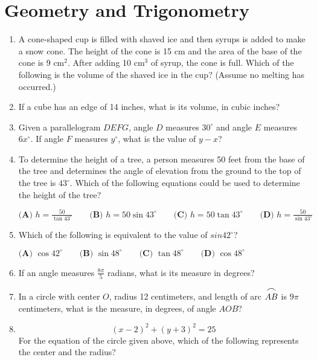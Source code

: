 \documentclass[../satmath.tex]{subfiles}
\begin{document}
\chapter{Geometry and Trigonometry}
\begin{enumerate}[label=\bfseries\arabic*.]

\item A cone-shaped cup is filled with shaved ice and then syrups is added to make a snow cone. The height of the cone is 15 cm and the area of the base of the cone is 
9 cm$^2$. After adding 10 cm$^3$ of syrup, the cone is full. Which of the following is the volume of the shaved ice in the cup? (Assume no melting has occurred.)
 
\item If a cube has an edge of 14 inches, what is its volume, in cubic inches?
 
\item Given a parallelogram $DEFG$, angle $D$ measures $30^{\circ}$ and angle $E$ measures $6x^{\circ}$. If angle $F$ measures $y^{\circ}$, what is the value of $y-x$?
 
\item To determine the height of a tree, a person measures 50 feet from the base of the tree and determines the angle of elevation from the ground to the top of the tree is $43^{\circ}$. Which of the following equations could be used to determine the height of the tree?

$\textbf{(A) } h=\frac{50}{\tan 43^{\circ}} \qquad \textbf{(B) } h=50\sin 43^{\circ} \qquad \textbf{(C) } h=50 \tan 43^{\circ} \qquad \textbf{(D) } h=\frac{50}{\sin 43^{\circ}}$
 
\item Which of the following is equivalent to the value of $sin 42^{\circ}$?

$\textbf{(A) } \cos 42^{\circ} \qquad \textbf{(B) }\sin 48^{\circ} \qquad \textbf{(C) }\tan 48^{\circ}\qquad \textbf{(D) }\cos 48^{\circ}$
 
\item If an angle measures $\frac{8\pi}{5}$ radians, what is its measure in degrees?
 
\item In a circle with center $O$, radius 12 centimeters, and length of arc $\stackrel{\mbox{\large$\frown$}}{AB}$ is $9\pi$ centimeters, what is the measure, in degrees, of angle $AOB$?
 
\item
\[(x-2)^2+(y+3)^2=25\]
For the equation of the circle given above, which of the following represents the center and the radius?


\end{enumerate}
\end{document}

